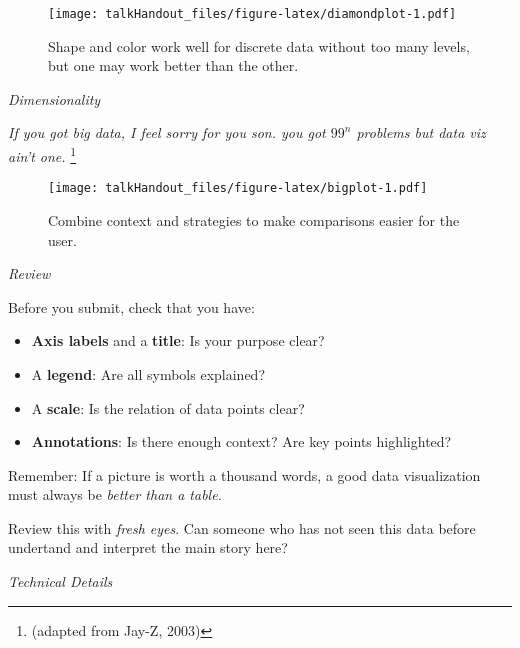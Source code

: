 \documentclass{tufte-handout}
\begin{document}
\begin{figure*}
 \texttt{[image: talkHandout\_files/figure-latex/diamondplot-1.pdf]}
\caption{Shape and color work well for discrete data without too many levels, but one may work better than the other.}
\end{figure*}
\clearpage
\noindent \emph{Dimensionality}

\noindent \emph{If you got big data, I feel sorry for you son. you got \(99^{n}\)
problems but data viz ain't one.} \footnote{(adapted from Jay-Z, 2003)}

\begin{figure*}
 \texttt{[image: talkHandout\_files/figure-latex/bigplot-1.pdf]}
\caption{Combine context and strategies to make comparisons easier for the user.}
\end{figure*}

\noindent \emph{Review}

\noindent Before you submit, check that you have:

\begin{itemize}
\itemsep1pt\parskip0pt
\item
  \textbf{Axis labels} and a \textbf{title}: Is your purpose clear?
\item
  A \textbf{legend}: Are all symbols explained?
\item
  A \textbf{scale}: Is the relation of data points clear?
\item
  \textbf{Annotations}: Is there enough context? Are key points
  highlighted?
\end{itemize}

\noindent Remember: If a picture is worth a thousand words, a good data
visualization must always be \emph{better than a table.}

\vspace{2.5mm}

\noindent Review this with \emph{fresh eyes}. Can someone who has not
seen this data before undertand and interpret the main story here?

\vspace{2.5mm}
\noindent \emph{Technical Details}
\end{document}
